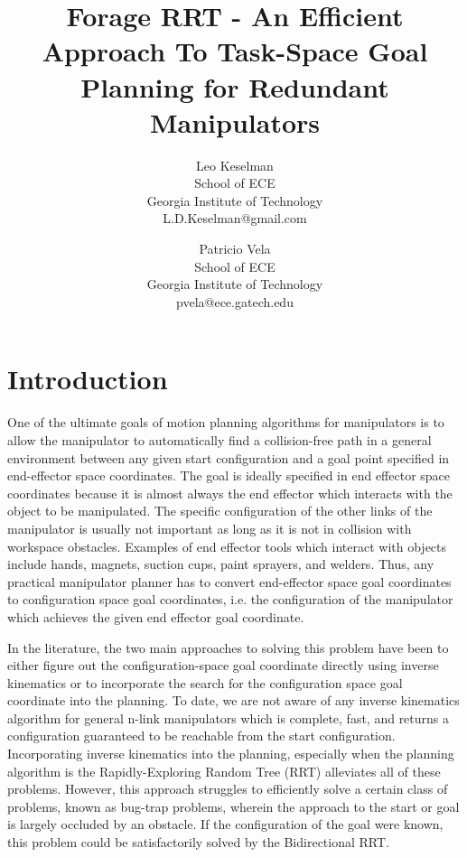 \documentclass[conference]{IEEEtran}
\begin{document}
\title{Forage RRT - An Efficient Approach To Task-Space Goal Planning for Redundant Manipulators}
\author{Leo Keselman\\
	School of ECE\\
	 Georgia Institute of Technology\\
	 L.D.Keselman@gmail.com \and
	Patricio Vela\\ 
	School of ECE\\
	Georgia Institute of Technology\\
	 pvela@ece.gatech.edu
}
\maketitle
\section{Introduction}
One of the ultimate goals of motion planning algorithms for manipulators is to allow the manipulator to automatically find a collision-free
path in a general environment between any given start configuration and a goal point specified in end-effector space coordinates. The goal
is ideally specified in end effector space coordinates because it is almost always the end effector which interacts with the object to be
manipulated. The specific configuration of the other links of the manipulator is usually not important as long as it is not in collision
with workspace obstacles. Examples of end effector tools which interact with objects include hands, magnets, suction cups, paint sprayers,
and welders. Thus, any practical manipulator planner has to convert end-effector space goal coordinates to configuration space goal
coordinates, i.e. the configuration of the manipulator which achieves the given end effector goal coordinate.

In the literature, the two main approaches to solving this problem have been to either figure out the configuration-space goal coordinate
directly using inverse kinematics or to incorporate the search for the configuration space goal coordinate into the planning. To date, we
are not aware of any inverse kinematics algorithm for general n-link manipulators which is complete, fast, and returns a configuration
guaranteed to be reachable from the start configuration. Incorporating inverse kinematics into the planning, especially when the planning
algorithm is the Rapidly-Exploring Random Tree (RRT) alleviates all of these problems. However, this approach struggles to efficiently solve
a certain class of problems, known as bug-trap problems, wherein the approach to the start or goal is largely occluded by an obstacle. If
the configuration of the goal were known, this problem could be satisfactorily solved by the Bidirectional RRT. 
\end{document}
